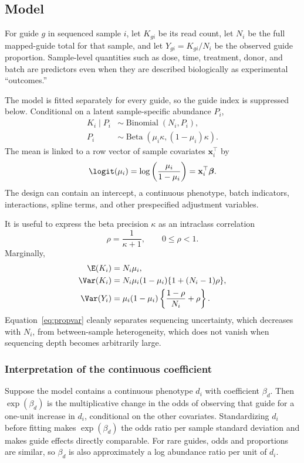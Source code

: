 \subsection{Model}

For guide $g$ in sequenced sample $i$, let $K_{gi}$ be its read count, let
$N_i$ be the full mapped-guide total for that sample, and let
$Y_{gi}=K_{gi}/N_i$ be the observed guide proportion.  Sample-level
quantities such as dose, time, treatment, donor, and batch are predictors even
when they are described biologically as experimental ``outcomes.''

The model is fitted separately for every guide, so the guide index is
suppressed below.  Conditional on a latent sample-specific abundance $P_i$,
\begin{align}
  K_i \mid P_i &\sim \operatorname{Binomial}(N_i,P_i),\\
  P_i &\sim \operatorname{Beta}(\mu_i\kappa,(1-\mu_i)\kappa).
\end{align}
The mean is linked to a row vector of sample covariates $\mathbf{x}_i^\top$ by
\begin{equation}
  \logit(\mu_i)
  = \log\left(\frac{\mu_i}{1-\mu_i}\right)
  = \mathbf{x}_i^\top\boldsymbol{\beta}.
  \label{eq:mean}
\end{equation}
The design can contain an intercept, a continuous phenotype, batch indicators,
interactions, spline terms, and other prespecified adjustment variables.

It is useful to express the beta precision $\kappa$ as an intraclass
correlation
\begin{equation}
  \rho = \frac{1}{\kappa+1}, \qquad 0\leq\rho<1.
\end{equation}
Marginally,
\begin{align}
  \E(K_i) &= N_i\mu_i,\\
  \Var(K_i) &=
  N_i\mu_i(1-\mu_i)\{1+(N_i-1)\rho\}, \label{eq:countvar}\\
  \Var(Y_i) &=
  \mu_i(1-\mu_i)
  \left\{\frac{1-\rho}{N_i}+\rho\right\}. \label{eq:propvar}
\end{align}
Equation~\eqref{eq:propvar} cleanly separates sequencing uncertainty, which
decreases with $N_i$, from between-sample heterogeneity, which does not vanish
when sequencing depth becomes arbitrarily large.

\subsubsection{Interpretation of the continuous coefficient}

Suppose the model contains a continuous phenotype $d_i$ with coefficient
$\beta_d$.  Then $\exp(\beta_d)$ is the multiplicative change in the odds of
observing that guide for a one-unit increase in $d_i$, conditional on the other
covariates.  Standardizing $d_i$ before fitting makes $\exp(\beta_d)$ the odds
ratio per sample standard deviation and makes guide effects directly
comparable.  For rare guides, odds and proportions are similar, so $\beta_d$ is
also approximately a log abundance ratio per unit of $d_i$.
